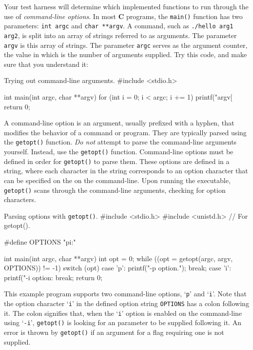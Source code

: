 \documentclass[11pt]{article}
\begin{document}
Your test harness will determine which implemented functions to run through the
use of \emph{command-line options}. In most \textbf{C} programs, the
\texttt{main()} function has two parameters: \texttt{int argc} and \texttt{char
**argv}. A command, such as \texttt{./hello arg1 arg2}, is split into an array
of strings referred to as arguments. The parameter \texttt{argv} is this array
of strings. The parameter \texttt{argc} serves as the argument counter, the
value in which is the number of arguments supplied. Try this code, and make sure
that you understand it:

\begin{codelisting}{Trying out command-line arguments.}
#include <stdio.h>

int main(int argc, char **argv) {
    for (int i = 0; i < argc; i += 1) {
        printf("argv[%
    }
    return 0;
}
\end{codelisting}

A command-line option is an argument, usually prefixed with a hyphen,
that modifies the behavior of a command or program. They are typically parsed
using the \texttt{getopt()} function. \emph{Do not} attempt to parse the command-line
arguments yourself. Instead, use the \texttt{getopt()} function. Command-line options
must be defined in order for \texttt{getopt()} to parse them. These options are defined
in a string, where each character in the string corresponds to an option character
that can be specified on the on the command-line. Upon running the executable,
\texttt{getopt()} scans through the command-line arguments, checking for option
characters.

\begin{codelisting}{Parsing options with \texttt{getopt()}.}
#include <stdio.h>
#include <unistd.h> // For getopt().

#define OPTIONS "pi:"

int main(int argc, char **argv) {
    int opt = 0;
    while ((opt = getopt(argc, argv, OPTIONS)) != -1) {
        switch (opt) {
        case 'p':
            printf("-p option.\n");
            break;
        case 'i':
            printf("-i option: %
            break;
        }
    }
    return 0;
}
\end{codelisting}

This example program supports two command-line options, `\texttt{p}' and
`\texttt{i}'. Note that the option character `\texttt{i}' in the defined option
string \texttt{OPTIONS} has a colon following it. The colon signifies that, when
the `\texttt{i}' option is enabled on the command-line using `\texttt{-i}',
\texttt{getopt()} is looking for an parameter to be supplied following it. An
error is thrown by \texttt{getopt()} if an argument for a flag requiring one is
not supplied.
\end{document}
